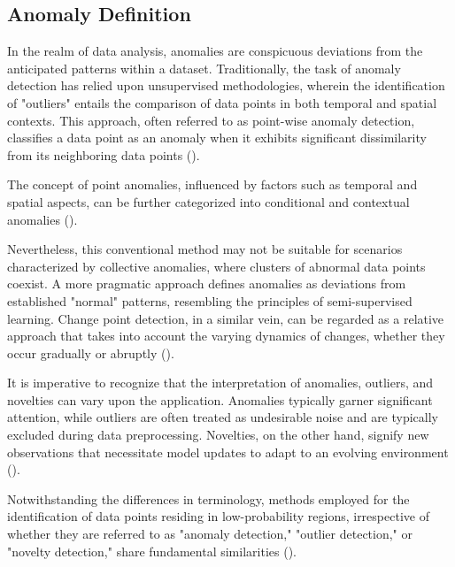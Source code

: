 \subsection{Anomaly Definition}\label{AA:AnomalyDefinition}
In the realm of data analysis, anomalies are conspicuous deviations from the anticipated patterns within a dataset. Traditionally, the task of anomaly detection has relied upon unsupervised methodologies, wherein the identification of "outliers" entails the comparison of data points in both temporal and spatial contexts. This approach, often referred to as point-wise anomaly detection, classifies a data point as an anomaly when it exhibits significant dissimilarity from its neighboring data points (\cite{IGLESIASVAZQUEZ2023120994}).

The concept of point anomalies, influenced by factors such as temporal and spatial aspects, can be further categorized into conditional and contextual anomalies (\cite{Ruff2021}).

Nevertheless, this conventional method may not be suitable for scenarios characterized by collective anomalies, where clusters of abnormal data points coexist. A more pragmatic approach defines anomalies as deviations from established "normal" patterns, resembling the principles of semi-supervised learning. Change point detection, in a similar vein, can be regarded as a relative approach that takes into account the varying dynamics of changes, whether they occur gradually or abruptly (\cite{IGLESIASVAZQUEZ2023120994}).

It is imperative to recognize that the interpretation of anomalies, outliers, and novelties can vary upon the application. Anomalies typically garner significant attention, while outliers are often treated as undesirable noise and are typically excluded during data preprocessing. Novelties, on the other hand, signify new observations that necessitate model updates to adapt to an evolving environment (\cite{Ruff2021}).

Notwithstanding the differences in terminology, methods employed for the identification of data points residing in low-probability regions, irrespective of whether they are referred to as "anomaly detection," "outlier detection," or "novelty detection," share fundamental similarities (\cite{IGLESIASVAZQUEZ2023120994}).
